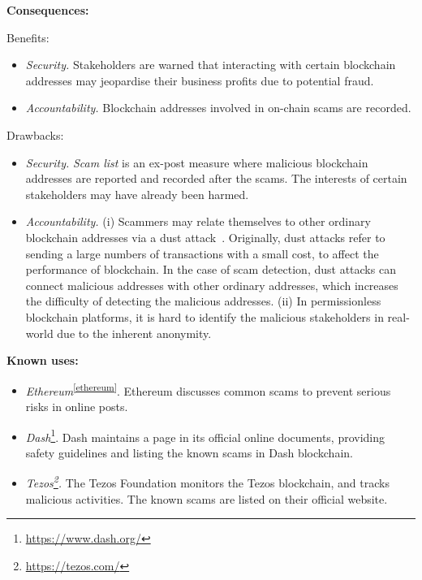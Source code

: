 \documentclass{article}
\begin{document}
\vspace{0.5em}\noindent \textbf{Consequences:} 

Benefits:
\begin{itemize}
  \item \textit{Security.} Stakeholders are warned that interacting with certain blockchain addresses may jeopardise their business profits due to potential fraud.
  
  \item \textit{Accountability.} Blockchain addresses involved in on-chain scams are recorded.
\end{itemize}

Drawbacks:
\begin{itemize}
  \item \textit{Security.} \textit{Scam list} is an ex-post measure where malicious blockchain addresses are reported and recorded after the scams. The interests of certain stakeholders may have already been harmed.
  
  \item \textit{Accountability.} (i) Scammers may relate themselves to other ordinary blockchain addresses via a dust attack~\cite{BRADBURY20135}. Originally, dust attacks refer to sending a large numbers of transactions with a small cost, to affect the performance of blockchain. In the case of scam detection, dust attacks can connect malicious addresses with other ordinary addresses, which increases the difficulty of detecting the malicious addresses. (ii) In permissionless blockchain platforms, it is hard to identify the malicious stakeholders in real-world due to the inherent anonymity.
\end{itemize}


\vspace{0.5em}\noindent \textbf{Known uses:}  
 \begin{itemize}
   \item \textit{Ethereum}\textsuperscript{\ref{ethereum}}. Ethereum discusses common scams to prevent serious risks in online posts.
 
   \item \textit{Dash}\footnote{\url{https://www.dash.org/}\label{dash}}. Dash maintains a page in its official online documents, providing safety guidelines and listing the known scams in Dash blockchain.
   
   \item \textit{Tezos\footnote{\url{https://tezos.com/}\label{tezos}}.} The Tezos Foundation monitors the Tezos blockchain, and tracks malicious activities. The known scams are listed on their official website.
 \end{itemize}
\end{document}
